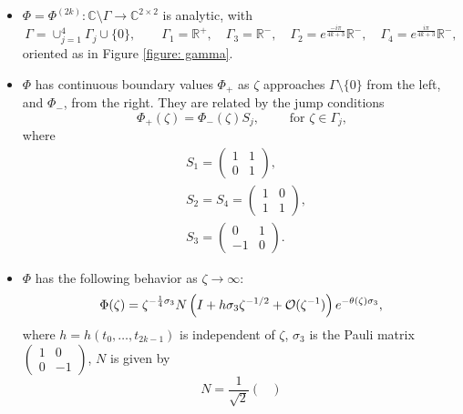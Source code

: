 \documentclass[11pt,fleqn]{article}
\numberwithin{equation}{section}
\def\bigO{{\cal O}}
\begin{document}
\begin{itemize}
    \item[(a)] $\Phi=\Phi^{(2k)}:\mathbb C\setminus \Gamma\to \mathbb C^{2\times 2}$ is analytic, with \[\Gamma=\cup_{j=1}^4\Gamma_j\cup\{0\}, \qquad \Gamma_1=\mathbb R^+,\quad\Gamma_3=\mathbb R^-, \quad \Gamma_2=e^{\frac{-i\pi}{4k+3}}\mathbb R^-, \quad \Gamma_4=e^{\frac{i\pi}{4k+3}}\mathbb R^-,\] oriented as in Figure \ref{figure: gamma}.
    \item[(b)] $\Phi$ has continuous boundary values $\Phi_+$ as $\zeta$ approaches
$\Gamma\setminus\{0\}$ from the left, and $\Phi_-$,
from the right. They are related by the jump conditions \begin{equation}\label{RHP Phi: b}\Phi_+(\zeta)=\Phi_-(\zeta)S_j,\qquad \mbox{ for $\zeta\in\Gamma_j$,}
\end{equation}
 where
 \begin{align}
        \label{S1}
        &S_1=\begin{pmatrix}
            1 & 1 \\
            0 & 1
        \end{pmatrix},\\
        \label{S24}
        &S_2=S_4=\begin{pmatrix}
            1 & 0 \\
            1 & 1
        \end{pmatrix},\\
        \label{S3}
        &S_3=
        \begin{pmatrix}
            0 & 1 \\
            -1 & 0
        \end{pmatrix}.
    \end{align}
    \item[(c)] $\Phi$ has the following behavior as $\zeta\to\infty$:
    \begin{equation}\label{RHP Psik: c}
        \Phi(\zeta)=\zeta^{-\frac{1}{4}\sigma_3}N\left(I+h\sigma_3\zeta^{-1/2}+
    \bigO(\zeta^{-1})\right)
        e^{-\theta(\zeta)\sigma_3},
    \end{equation}
    where $h=h(t_0, \ldots , t_{2k-1})$ is independent of $\zeta$, $\sigma_3$ is the Pauli matrix $\begin{pmatrix}1&0\\0&-1\end{pmatrix}$, $N$ is given by
    \begin{equation}\label{def: N0}
        N=\frac{1}{\sqrt 2}
        \begin{pmatrix}

\end{pmatrix}
\end{equation}
\end{itemize}
\end{document}
